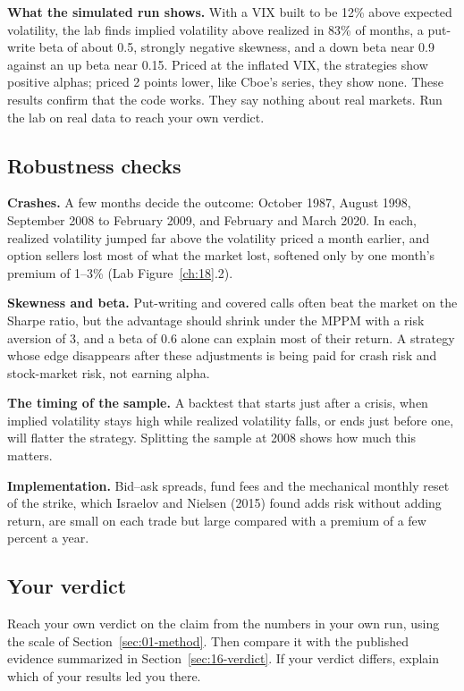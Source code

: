 \textbf{What the simulated run shows.} With a VIX built to be 12\% above expected volatility, the lab finds implied volatility above realized in 83\% of months, a put-write beta of about 0.5, strongly negative skewness, and a down beta near 0.9 against an up beta near 0.15. Priced at the inflated VIX, the strategies show positive alphas; priced 2 points lower, like Cboe's series, they show none. These results confirm that the code works. They say nothing about real markets. Run the lab on real data to reach your own verdict.

\subsection{Robustness checks}
\label{sec:16-stress}

\textbf{Crashes.} A few months decide the outcome: October 1987, August 1998, September 2008 to February 2009, and February and March 2020. In each, realized volatility jumped far above the volatility priced a month earlier, and option sellers lost most of what the market lost, softened only by one month's premium of 1--3\% (Lab Figure~\ref{ch:18}.2).

\textbf{Skewness and beta.} Put-writing and covered calls often beat the market on the Sharpe ratio, but the advantage should shrink under the MPPM with a risk aversion of 3, and a beta of 0.6 alone can explain most of their return. A strategy whose edge disappears after these adjustments is being paid for crash risk and stock-market risk, not earning alpha.

\textbf{The timing of the sample.} A backtest that starts just after a crisis, when implied volatility stays high while realized volatility falls, or ends just before one, will flatter the strategy. Splitting the sample at 2008 shows how much this matters.

\textbf{Implementation.} Bid--ask spreads, fund fees and the mechanical monthly reset of the strike, which Israelov and Nielsen (2015) found adds risk without adding return, are small on each trade but large compared with a premium of a few percent a year.

\subsection*{Your verdict}

Reach your own verdict on the claim from the numbers in your own run, using the scale of Section~\ref{sec:01-method}. Then compare it with the published evidence summarized in Section~\ref{sec:16-verdict}. If your verdict differs, explain which of your results led you there.


